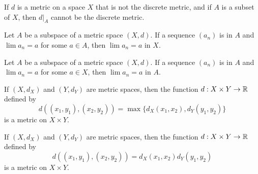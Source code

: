 	\item If $d$ is a metric on a space $X$ that is not the discrete metric, and if $A$ is a subset of $X$, then $d|_A$ cannot be the discrete metric. 
	
	\item Let $A$ be a subspace of a metric space $(X,d)$. If a sequence $(a_n)$ is in $A$ and $\lim a_n = a$ for some $a \in A$, then $\lim a_n = a$ in $X$. 

	\item Let $A$ be a subspace of a metric space $(X,d)$. If a sequence $(a_n)$ is in $A$ and $\lim a_n = a$ for some $a \in X$, then $\lim a_n = a$ in $A$. 	
	
	\item If $(X,d_X)$ and $(Y, d_Y)$ are metric spaces, then the function $d: X \times Y \to \mathbb{R}$ defined by 
	\[d((x_1,y_1), (x_2,y_2)) = \max\{d_X(x_1,x_2), d_Y(y_1,y_2)\}\]
	is a metric on $X \times Y$. 
	
	\item If $(X,d_X)$ and $(Y, d_Y)$ are metric spaces, then the function $d: X \times Y \to \mathbb{R}$ defined by 
	\[d((x_1,y_1), (x_2,y_2)) = d_X(x_1,x_2)d_Y(y_1,y_2)\]
	is a metric on $X \times Y$.
		
	\ea

